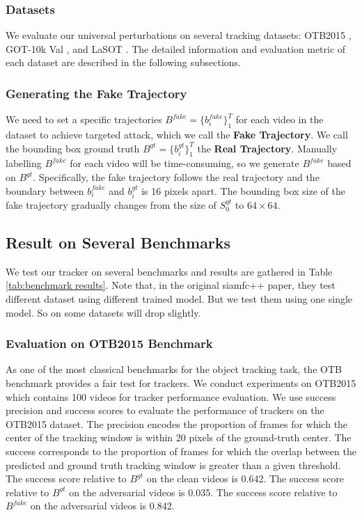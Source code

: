 \documentclass{article}
\begin{document}
\subsubsection{Datasets}
We evaluate our universal perturbations on several tracking datasets: OTB2015 \cite{OTB}, GOT-10k Val \cite{GOT-10k}, and LaSOT \cite{LaSOT}.
The detailed information and evaluation metric of each dataset are described in the following subsections.

\subsubsection{Generating the Fake Trajectory}

We need to set a specific trajectories $B^{fake}=\{b^{fake}_i\}_1^{T}$ for each video in the dataset to achieve targeted attack, which we call the \textbf{Fake Trajectory}. We call the bounding box ground truth $B^{gt}=\{b^{gt}_i\}_1^T$ the \textbf{Real Trajectory}.
Manually labelling $B^{fake}$ for each video will be time-consuming, so we generate $B^{fake}$ based on $B^{gt}$.
Specifically, the fake trajectory follows the real trajectory and the boundary between $b^{fake}_i$ and $b^{gt}_i$ is 16 pixels apart.
The bounding box size of the fake trajectory gradually changes from the size of $S^{gt}_0$ to $64\times 64$.

\subsection{Result on Several Benchmarks}

We test our tracker on several benchmarks and results are gathered in Table \ref{tab:benchmark results}.
Note that, in the original siamfc++ paper, they test different dataset using different trained model. But we test them using one single model. So on some datasets will drop slightly.

\subsubsection{Evaluation on OTB2015 Benchmark}

As one of the most classical benchmarks for the object tracking task, the OTB benchmark provides a fair test for trackers. We conduct experiments on OTB2015 \cite{OTB} which contains 100 videos for tracker performance evaluation.
We use success precision and success scores to evaluate the performance of trackers on the OTB2015 dataset.
The precision encodes the proportion of frames for which the center of the tracking window is within 20 pixels of the ground-truth center. The success corresponds to the proportion of frames for which the overlap between the predicted and ground truth tracking window is greater than a given threshold.
The success score relative to $B^{gt}$ on the clean videos is 0.642. The success score relative to $B^{gt}$ on the adversarial videos is 0.035. The success score relative to $B^{fake}$ on the adversarial videos is 0.842.
\end{document}
